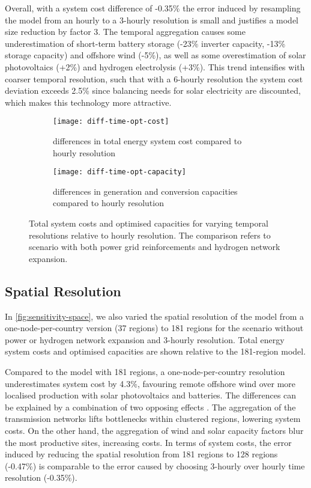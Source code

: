 Overall, with a system cost difference of -0.35\% the error induced by
resampling the model from an hourly to a 3-hourly resolution is small and
justifies a model size reduction by factor 3. The temporal aggregation causes
some underestimation of short-term battery storage (-23\% inverter capacity,
-13\% storage capacity) and offshore wind (-5\%), as well as some overestimation
of solar photovoltaics (+2\%) and hydrogen electrolysis (+3\%). This trend
intensifies with coarser temporal resolution, such that with a 6-hourly
resolution the system cost deviation exceeds 2.5\% since balancing needs for
solar electricity are discounted, which makes this technology more attractive.

\begin{figure}
    \centering
    \begin{subfigure}[t]{\textwidth}
        \centering
        \caption{differences in total energy system cost compared to hourly resolution}
        \texttt{[image: diff-time-opt-cost]}
        \label{fig:sensitivity-time-cost}
    \end{subfigure}
    \begin{subfigure}[t]{\textwidth}
        \centering
        \caption{differences in generation and conversion capacities compared to hourly resolution}
        \texttt{[image: diff-time-opt-capacity]}
        \label{fig:sensitivity-time-cap}
    \end{subfigure}
    \caption{ Total system costs and optimised capacities for varying temporal
    resolutions relative to hourly resolution. The comparison refers to scenario
    with both power grid reinforcements and hydrogen network expansion. }
    \label{fig:sensitivity-time}
\end{figure}

\subsection{Spatial Resolution}
\label{sec:si:sensitivity-space}

In \cref{fig:sensitivity-space}, we also varied the spatial resolution of the
model from a one-node-per-country version (37 regions) to 181 regions for the
scenario without power or hydrogen network expansion and 3-hourly resolution.
Total energy system costs and optimised capacities are shown relative to the
181-region model.

Compared to the model with 181 regions, a one-node-per-country resolution
underestimates system cost by 4.3\%, favouring remote offshore wind over more
localised production with solar photovoltaics and batteries. The differences can
be explained by a combination of two opposing
effects . The aggregation of the transmission
networks lifts bottlenecks within clustered regions, lowering system costs. On
the other hand, the aggregation of wind and solar capacity factors blur the most
productive sites, increasing costs. In terms of system costs, the error induced
by reducing the spatial resolution from 181 regions to 128 regions (-0.47\%) is
comparable to the error caused by choosing 3-hourly over hourly time resolution
(-0.35\%).

